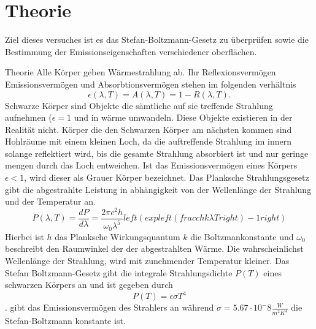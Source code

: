 \section{Theorie}
\label{sec:Theorie}
Ziel dieses versuches ist es das Stefan-Boltzmann-Gesetz zu überprüfen sowie die
Bestimmung der Emissionseigenschaften verschiedener oberflächen.

Theorie
Alle Körper geben Wärmestrahlung ab. Ihr Reflexionsvermögen Emissionsvermögen und
Absorbtionsvermögen stehen im folgenden verhältnis
\begin{equation}
\epsilon(\lambda,T)=A(\lambda,T)=1-R(\lambda,T).
\end{equation}
Schwarze Körper sind Objekte die sämtliche auf sie treffende Strahlung aufnehmen
($\epsilon=1$ und in wärme umwandeln. Diese Objekte existieren in der Realität
nicht. Körper die den Schwarzen Körper am nächsten kommen sind Hohlräume mit
einem kleinen Loch, da die auftreffende Strahlung im innern solange reflektiert
wird, bis die gesamte Strahlung absorbiert ist und nur geringe mengen durch das
Loch entweichen. Ist das Emissionsvermögen eines Körpers $\epsilon< 1$, wird
dieser als Grauer Körper bezeichnet. Das Planksche Strahlungsgesetz gibt die
abgestrahlte Leistung in abhängigkeit von der Wellenlänge der Strahlung und der
Temperatur an.
\begin{equation}
  P(\lambda,T)=\frac{dP}{d\lambda}=\frac{2\pi c^2h}{\omega_0\lambda^5}
  left( exp left( frac{ch}{k\lambda T}right) -1 right)
\end{equation}
Hierbei ist $h$ das Planksche Wirkungsquantum $k$ die Boltzmankonstante und $\omega_0$
beschreibt den Raumwinkel der der abgestrahlten Wärme. Die wahrscheinlichst
Wellenlänge der Strahlung, wird mit zunehmender Temperatur kleiner. Das
Stefan Boltzmann-Gesetz gibt die integrale Strahlungsdichte $P(T)$ eines schwarzen
Körpers an und ist gegeben durch
\begin{equation}
P(T)=\epsilon \sigma T^4
\end{equation}
.
\epsilon gibt das Emissionsvermögen des Strahlers an während
$\sigma=5.67\cdot 10^-8 \frac{W}{m^2K^4}$ die Stefan-Boltzmann konstante ist.

\cite{sample}
